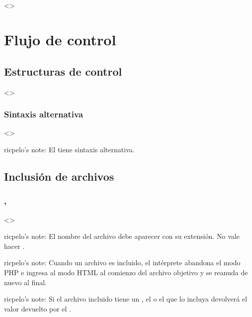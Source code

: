 \documentclass[a4paper,12pt,spanish]{sphinxmanual}
\begin{document}
\subsection{}
\label{\detokenize{php:defined}}
\textless{}\textgreater{}


\section{Flujo de control}
\label{\detokenize{php:flujo-de-control}}

\subsection{Estructuras de control}
\label{\detokenize{php:estructuras-de-control}}
\textless{}\textgreater{}


\subsubsection{Sintaxis alternativa}
\label{\detokenize{php:sintaxis-alternativa}}
\textless{}\textgreater{}

ricpelo’s note: El   tiene sintaxis
alternativa.


\subsection{Inclusión de archivos}
\label{\detokenize{php:inclusion-de-archivos}}

\subsubsection{, }
\label{\detokenize{php:include-require}}
\textless{}\textgreater{}

\begin{DUlineblock}{0em}
\item[] ricpelo’s note: El nombre del archivo debe aparecer con su extensión.
No vale hacer .
\item[] ricpelo’s note: Cuando un archivo es incluido, el intérprete abandona
el modo PHP e ingresa al modo HTML al comienzo del archivo objetivo y
se reanuda de nuevo al final.
\item[] ricpelo’s note: Si el archivo incluido tiene un , el
 o el  que lo incluya devolverá el valor
devuelto por el .
\end{DUlineblock}
\end{document}
